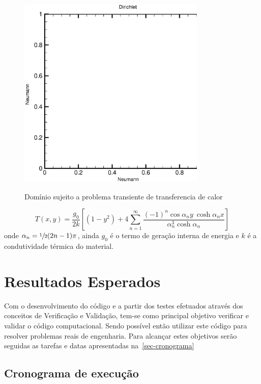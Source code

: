 \documentclass[
	12pt,				  %
	openright,		%
	twoside,			%
	a4paper,			%
	chapter=TITLE,		    %
	english,			%
	brazil				%
	]{abntex2}
\begin{document}
\begin{figure}[!htb]
\centering
\caption[Domínio sujeito a problema transiente de transferencia de calor]
    {Domínio sujeito a problema transiente de transferencia de calor}
\includegraphics[width=0.8\textwidth]{figures/unitarysquare.eps}
\label{fig-dominio2}
\end{figure}

\begin{equation}
    T(x,y) = \frac{g_0}{2 k} \left[ (1 - y^2) + 4\sum_{n=1}^{\infty}
    \frac{{(-1)}^n \cos \alpha_n y~\cosh \alpha_n x}{\alpha_n^3 \cosh \alpha_n}
    \right]
    \label{eq-solexact2}
\end{equation}
onde $\alpha_n = \sfrac{1}{2}(2n -1)\pi$, ainda $g_0$ é o termo de geração interna de
energia e $k$ é a condutividade térmica do material. 

\chapter{Resultados Esperados}\label{chap-results}

Com o desenvolvimento do código e a partir dos testes efetuados através dos
conceitos de Verificação e Validação, tem-se como principal objetivo verificar
e validar o código computacional. Sendo possível então utilizar este código
para resolver problemas reais de engenharia. Para alcançar estes objetivos
serão seguidas as tarefas e datas apresentadas na~\autoref{sec-cronograma}

\section{Cronograma de execução}\label{sec-cronograma}
\end{document}
